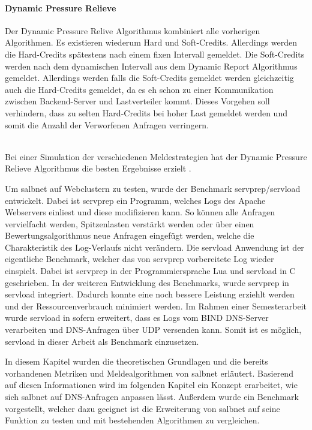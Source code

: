 \documentclass[a4paper, 12pt, BCOR10mm, DIV12, toc=bibliography, toc=listof, german]{scrbook}
\begin{document}

	\paragraph{Dynamic Pressure Relieve} %
	\label{par:dynamic-pressure-relieve}
	
	Der Dynamic Pressure Relive Algorithmus kombiniert alle vorherigen Algorithmen. Es existieren
	wiederum Hard und Soft-Credits. Allerdings werden die Hard-Credits spätestens nach einem fixen
	Intervall gemeldet. Die Soft-Credits werden nach dem dynamischen Intervall aus dem Dynamic Report
	Algorithmus gemeldet. Allerdings werden falls die Soft-Credits gemeldet werden gleichzeitig auch
	die Hard-Credits gemeldet, da es eh schon zu einer Kommunikation zwischen Backend-Server und
	Lastverteiler kommt. Dieses Vorgehen soll verhindern, dass zu selten Hard-Credits bei hoher Last
	gemeldet werden und somit die Anzahl der Verworfenen Anfragen verringern.

$~$\\

	Bei einer Simulation der verschiedenen Meldestrategien hat der Dynamic Pressure Relieve
	Algorithmus die besten Ergebnisse erzielt \cite{scsczile2008}.

	Um salbnet auf Webclustern zu testen, wurde der Benchmark servprep/servload \cite{habenschuss2011}
	entwickelt. Dabei ist servprep ein Programm, welches Logs des Apache Webservers einliest und diese
	modifizieren kann. So können alle Anfragen vervielfacht werden, Spitzenlasten verstärkt werden
	oder über einen Bewertungsalgorithmus neue Anfragen eingefügt werden, welche die Charakteristik
	des Log-Verlaufs nicht verändern. Die servload Anwendung ist der eigentliche Benchmark, welcher
	das von servprep vorbereitete Log wieder einspielt. Dabei ist servprep in der Programmiersprache
	Lua und servload in C geschrieben. In der weiteren Entwicklung des Benchmarks, wurde servprep in
	servload integriert. Dadurch konnte eine noch bessere Leistung erziehlt werden und der
	Ressourcenverbrauch minimiert werden. Im Rahmen einer Semesterarbeit \cite{menski2012} wurde
	servload in sofern erweitert, dass es Logs vom BIND DNS-Server verarbeiten und DNS-Anfragen über
	UDP versenden kann. Somit ist es möglich, servload in dieser Arbeit als Benchmark einzusetzen.

	In diesem Kapitel wurden die theoretischen Grundlagen und die bereits vorhandenen Metriken und
	Meldealgorithmen von salbnet erläutert. Basierend auf diesen Informationen wird im folgenden
	Kapitel ein Konzept erarbeitet, wie sich salbnet auf DNS-Anfragen anpassen lässt. Außerdem wurde
	ein Benchmark vorgestellt, welcher dazu geeignet ist die Erweiterung von salbnet auf seine
	Funktion zu testen und mit bestehenden Algorithmen zu vergleichen. 
\end{document}
